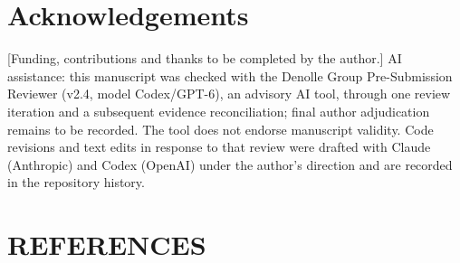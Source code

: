 \documentclass[
  referee]{gji}
\begin{document}
\section*{Acknowledgements}\label{acknowledgements}

{[}Funding, contributions and thanks to be completed by the author.{]}
AI assistance: this manuscript was checked with the Denolle Group
Pre-Submission Reviewer (v2.4, model Codex/GPT-6), an advisory AI tool,
through one review iteration and a subsequent evidence reconciliation;
final author adjudication remains to be recorded. The tool does not
endorse manuscript validity. Code revisions and text edits in response
to that review were drafted with Claude (Anthropic) and Codex (OpenAI)
under the author's direction and are recorded in the repository history.

\section*{REFERENCES}\label{references}

\renewcommand{\bibsection}{}

\end{document}
